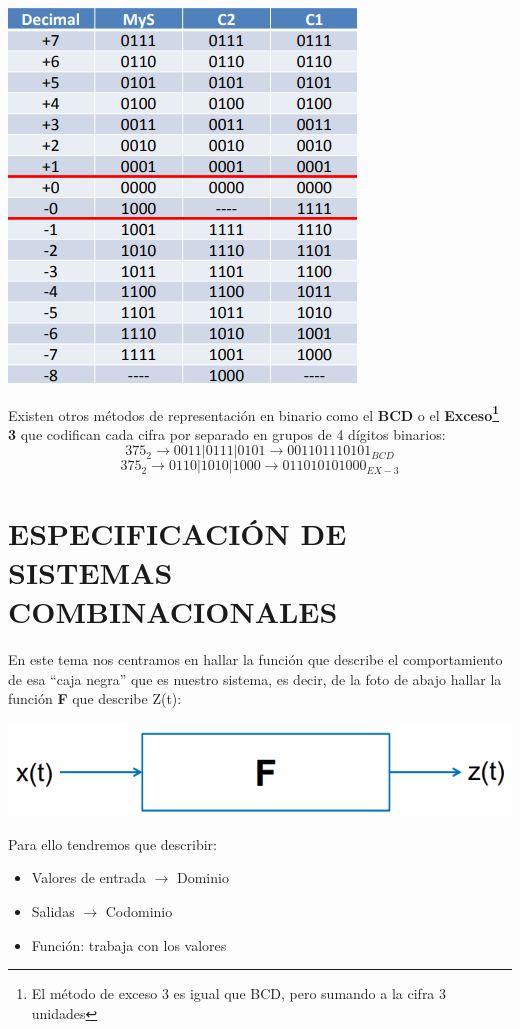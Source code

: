 \documentclass[a4paper,10pt]{book}
\begin{document}
\begin{center}
\includegraphics[scale=0.75]{comparacion de codigos}
\end{center}

Existen otros métodos de representación en binario como el \textbf{BCD} o el \textbf{Exceso\footnote{El método de exceso 3 es igual que BCD, pero sumando a la cifra 3 unidades} 3} que codifican cada cifra por separado en grupos de 4 dígitos binarios:
$$375_2\rightarrow 0011|0111|0101\rightarrow 001101110101_{BCD}$$
$$375_2\rightarrow 0110|1010|1000\rightarrow 011010101000_{EX-3}$$

\chapter*{ESPECIFICACIÓN DE SISTEMAS COMBINACIONALES}
En este tema nos centramos en hallar la función que describe el comportamiento de esa ``caja negra'' que es nuestro sistema, es decir, de la foto de abajo hallar la función \textbf{F} que describe Z(t):

\begin{center}
\includegraphics[scale=0.35]{sistema digital}
\end{center}

Para ello tendremos que describir:
\begin{itemize}
\item Valores de entrada $\rightarrow$ Dominio 
\item Salidas $\rightarrow$ Codominio
\item Función: trabaja con los valores
\end{itemize}
\end{document}
